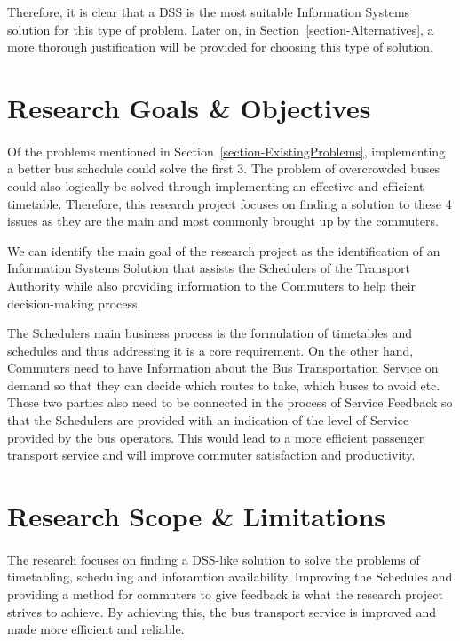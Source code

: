 Therefore, it is clear that a DSS is the most suitable Information Systems solution for this type of problem. Later on, in Section~\ref{section-Alternatives}, a more thorough justification will be provided for choosing this type of solution.

\newpage

\section{Research Goals \& Objectives}
\label{section-ResearchGoalsAndObjectives}

\paragraph{ } Of the problems mentioned in Section~\ref{section-ExistingProblems}, implementing a better bus schedule could solve the first 3. The problem of overcrowded buses could also logically be solved through implementing an effective and efficient timetable. Therefore, this research project focuses on finding a solution to these 4 issues as they are the main and most commonly brought up by the commuters.

We can identify the main goal of the research project as the identification of an Information Systems Solution that assists the Schedulers of the Transport Authority while also providing information to the Commuters to help their decision-making process. 

The Schedulers main business process is the formulation of timetables and schedules and thus addressing it is a core requirement. On the other hand, Commuters need to have Information about the Bus Transportation Service on demand so that they can decide which routes to take, which buses to avoid etc. These two parties also need to be connected in the process of Service Feedback so that the Schedulers are provided with an indication of the level of Service provided by the bus operators. This would lead to a more efficient passenger transport service and will improve commuter satisfaction and productivity.

\section{Research Scope \& Limitations}
\label{section-ResearchScope}

\paragraph{ } The research focuses on finding a DSS-like solution to solve the problems of timetabling, scheduling and inforamtion availability. Improving the Schedules and providing a method for commuters to give feedback is what the research project strives to achieve. By achieving this, the bus transport service is improved and made more efficient and reliable. 

